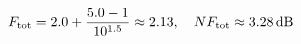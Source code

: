 \documentclass[preview]{standalone}
\begin{document}
\begin{align*}
\special{dvisvgm:raw <g id='unique000'>}F_{\rm tot}=2.0 + \frac{5.0-1}{10^{1.5}}\approx 2.13,\quad NF_{\rm tot}\approx3.28\,\text{dB}\special{dvisvgm:raw </g>}
\end{align*}
\end{document}

